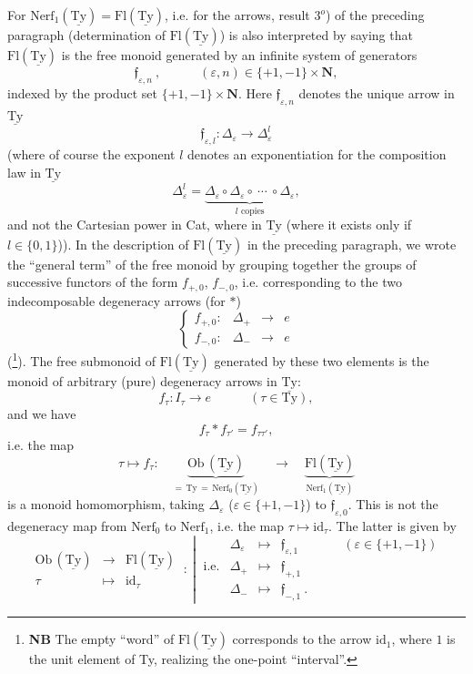 \documentclass[11pt]{article}
\newcommand{\printedpage}[1]{\marginpar{\footnotesize p.~#1}}
\newcommand{\msp}[1]{\marginpar{\footnotesize [#1]}}
\newcommand{\uTy}{\underline{\mathrm{Ty}}}
\begin{document}
\msp{page 50$'$}
For $\mathrm{Nerf}_1(\uTy) = \mathrm{Fl}(\uTy)$, i.e. for the arrows, result $3^o$) of the preceding paragraph (determination of $\mathrm{Fl}(\uTy)$) is also interpreted by saying that $\mathrm{Fl}(\uTy)$ is the free monoid generated by an infinite system of generators
\[
\mathfrak{f}_{\varepsilon,n}\ , \qquad\quad (\varepsilon,n)\in\{+1,-1\}\times\mathbf{N},
\]
indexed by the product set $\{+1,-1\}\times\mathbf{N}$. Here $\mathfrak{f}_{\varepsilon,n}$ denotes the unique arrow in $\uTy$
\[
\mathfrak{f}_{\varepsilon,l} : \Delta_\varepsilon \longrightarrow \Delta^l_\varepsilon
\]
(where of course the exponent $l$ denotes an exponentiation for the composition law in $\uTy$
\[
\Delta^l_\varepsilon = \underbrace{\Delta_\varepsilon\circ\Delta_\varepsilon\circ\ \cdots\ \circ\Delta_\varepsilon}_{l\text{ copies}},
\]
and not the Cartesian power in Cat, where in $\uTy$ (where it exists only if $l\in\{0,1\}$)). %
In the description of $\mathrm{Fl}(\uTy)$ in the preceding paragraph, we wrote the ``general term'' of the free monoid by grouping together the groups of successive functors of the form $f_{+,0}$, $f_{-,0}$, i.e. corresponding to the two indecomposable degeneracy arrows (for $*$) %
\[
\left\{
\begin{array}{lccc}
f_{+,0} : & \Delta_+ & \longrightarrow & e\\[4pt]
f_{-,0} : & \Delta_- & \longrightarrow & e
\end{array}
\right.
\]
(\footnote[15]{\textbf{NB} The empty ``word'' of $\mathrm{Fl}(\uTy)$ corresponds to the arrow $\mathrm{id}_1$, where $1$ is the unit element of Ty, realizing the one-point ``interval''.}). The free submonoid of $\mathrm{Fl}(\uTy)$ generated by these two elements is the monoid of arbitrary (pure) degeneracy arrows
\printedpage{35}
\msp{page 51}
in $\uTy$:
\[
f_\tau : I_\tau \longrightarrow e \qquad\quad (\tau\in\mathrm{Ty}),
\]
and we have
\[
f_\tau * f_{\tau'} = f_{\tau\tau'},
\]
i.e. the map
\[
\tau \longmapsto f_\tau :\quad \underbrace{\mathrm{Ob}\,(\uTy)}_{=\,\mathrm{Ty}\,=\,\mathrm{Nerf}_0(\uTy)} \quad\longrightarrow\quad \underbrace{\mathrm{Fl}(\uTy)}_{\mathrm{Nerf}_1(\uTy)}
\]
is a monoid homomorphism, taking $\Delta_\varepsilon$ ($\varepsilon\in\{+1,-1\}$) to $\mathfrak{f}_{\varepsilon,0}$. This is not the degeneracy map from $\mathrm{Nerf}_0$ to $\mathrm{Nerf}_1$, i.e. the map $\tau\longmapsto\mathrm{id}_\tau$. The latter is given by %
\[
\begin{array}{ccc}
\mathrm{Ob}\,(\uTy) & \longrightarrow & \mathrm{Fl}(\uTy)\\[4pt]
\tau & \longmapsto & \mathrm{id}_\tau
\end{array}
\ :\
\left|\
\begin{array}{rcccl}
 & \Delta_\varepsilon & \longmapsto & \mathfrak{f}_{\varepsilon,1} & \qquad(\varepsilon\in\{+1,-1\})\\[4pt]
\text{i.e.} & \Delta_+ & \longmapsto & \mathfrak{f}_{+,1} & \\[4pt]
 & \Delta_- & \longmapsto & \mathfrak{f}_{-,1}\ . &
\end{array}
\right.
\]
\end{document}
